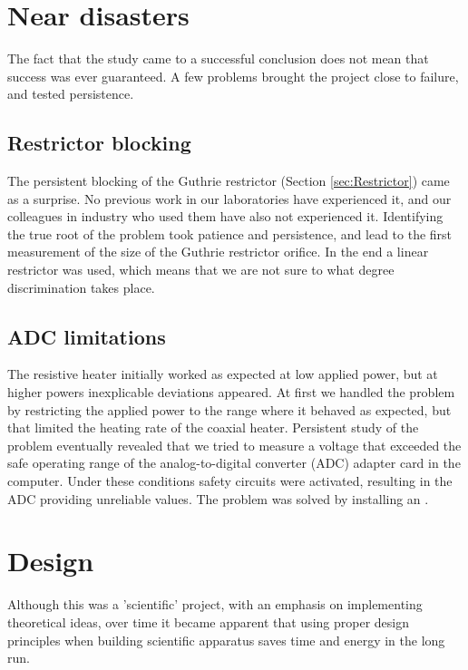\section{Near disasters}

The fact that the study came to a successful conclusion does not mean that
success was ever guaranteed. A few problems brought the project close to
failure, and tested persistence.

\subsection{Restrictor blocking}

The persistent blocking of the Guthrie restrictor (Section \ref{sec:Restrictor})
came as a surprise. No previous work in our laboratories have experienced it,
and our colleagues in industry who used them have also not experienced it.
Identifying the true root of the problem took patience and persistence, and lead
to the first measurement of the size of the Guthrie restrictor orifice. In the
end a linear restrictor was used, which means that we are not sure to what
degree discrimination takes place.

\subsection{ADC limitations}

The resistive heater initially worked as expected at low applied power, but at
higher powers inexplicable deviations appeared. At first we handled the problem
by restricting the applied power to the range where it behaved as expected, but
that limited the heating rate of the coaxial heater. Persistent study of the
problem eventually revealed that we tried to measure a voltage that exceeded the
safe operating range of the analog-to-digital converter (ADC) adapter card in
the computer. Under these conditions safety circuits were activated, resulting
in the ADC providing unreliable values. The problem was solved by installing an
.


\section{Design}

Although this was a 'scientific' project, with an emphasis on implementing
theoretical ideas, over time it became apparent that using proper design
principles when building scientific apparatus saves time and energy in the long
run.

